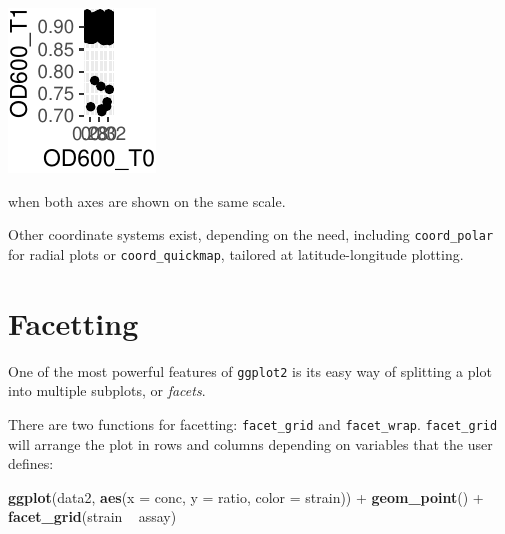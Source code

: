 \documentclass[]{book}
\newenvironment{Shaded}{}{}
\newcommand{\DataTypeTok}[1]{\textcolor[rgb]{0.56,0.13,0.00}{#1}}
\newcommand{\KeywordTok}[1]{\textcolor[rgb]{0.00,0.44,0.13}{\textbf{#1}}}
\newcommand{\NormalTok}[1]{#1}
\newcommand{\OperatorTok}[1]{\textcolor[rgb]{0.40,0.40,0.40}{#1}}
\newcommand{\StringTok}[1]{\textcolor[rgb]{0.25,0.44,0.63}{#1}}
\begin{document}
\begin{center}\includegraphics[width=\textwidth]{TRES-Tidy-Tutorial_files/figure-latex/unnamed-chunk-130-1} \end{center}

when both axes are shown on the same scale.

Other coordinate systems exist, depending on the need, including \texttt{coord\_polar} for radial plots or \texttt{coord\_quickmap}, tailored at latitude-longitude plotting.

\hypertarget{facetting}{%
\section{Facetting}\label{facetting}}

One of the most powerful features of \texttt{ggplot2} is its easy way of splitting a plot into multiple subplots, or \emph{facets}.

There are two functions for facetting: \texttt{facet\_grid} and \texttt{facet\_wrap}. \texttt{facet\_grid} will arrange the plot in rows and columns depending on variables that the user defines:

\begin{Shaded}
\begin{Highlighting}[]
\KeywordTok{ggplot}\NormalTok{(data2, }\KeywordTok{aes}\NormalTok{(}\DataTypeTok{x =}\NormalTok{ conc, }\DataTypeTok{y =}\NormalTok{ ratio, }\DataTypeTok{color =}\NormalTok{ strain)) }\OperatorTok{+}
\StringTok{  }\KeywordTok{geom_point}\NormalTok{() }\OperatorTok{+}
\StringTok{  }\KeywordTok{facet_grid}\NormalTok{(strain }\OperatorTok{~}\StringTok{ }\NormalTok{assay)}
\end{Highlighting}
\end{Shaded}
\end{document}
